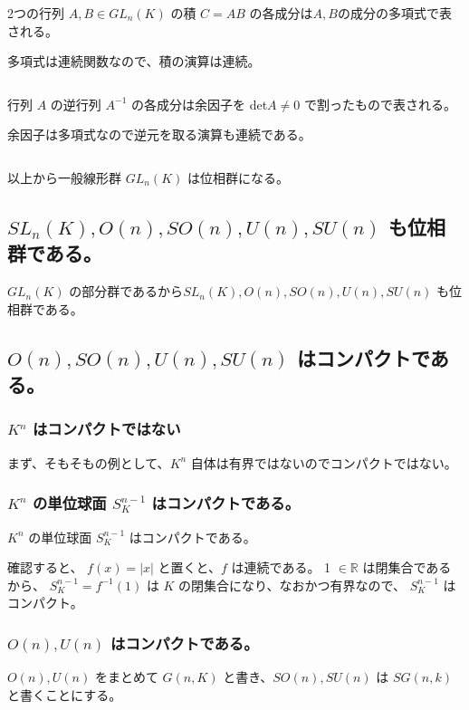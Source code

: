 \documentclass[uplatex,a4j,12pt,dvipdfmx]{jsarticle}
\begin{document}
2つの行列 $A,B \in GL_{n}(K)$ の積 $C=AB$ の各成分は$A,B$の成分の多項式で表される。

多項式は連続関数なので、積の演算は連続。

${}$

行列 $A$ の逆行列 $A^{-1}$ の各成分は余因子を det$A \neq 0$ で割ったもので表される。

余因子は多項式なので逆元を取る演算も連続である。

${}$

以上から一般線形群 $GL_{n}(K)$ は位相群になる。

\subsection{$SL_{n}(K),O(n),SO(n),U(n),SU(n)$ も位相群である。}

$GL_{n}(K)$ の部分群であるから$SL_{n}(K),O(n),SO(n),U(n),SU(n)$ も位相群である。



\subsection{$O(n),SO(n),U(n),SU(n)$ はコンパクトである。}

\subsubsection{$K^{n}$ はコンパクトではない}

まず、そもそもの例として、$K^{n}$ 自体は有界ではないのでコンパクトではない。


\subsubsection{$K^{n}$ の単位球面 $S_{K}^{n-1}$ はコンパクトである。}

$K^{n}$ の単位球面 $S_{K}^{n-1}$ はコンパクトである。

確認すると、
$f(x) = |x|$
と置くと、$f$ は連続である。
{1} $\in \mathbb{R}$ は閉集合であるから、
$S_{K}^{n-1} = f^{-1}(1)$ は $K$ の閉集合になり、なおかつ有界なので、
$S_{K}^{n-1}$ はコンパクト。


\subsubsection{$O(n),U(n)$ はコンパクトである。}

$O(n),U(n)$ をまとめて $G(n,K)$ と書き、$SO(n),SU(n)$ は $SG(n,k)$ と書くことにする。
\end{document}
